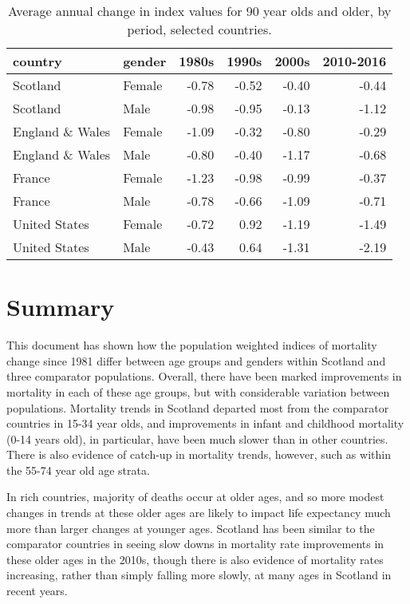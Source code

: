 \documentclass[]{article}
\begin{document}
\begin{table}

\caption{\label{tab:unnamed-chunk-12}Average annual change in index values for 90 year olds and older, by period, selected countries.}
\centering
\begin{tabular}[t]{l|l|r|r|r|r}
\hline
country & gender & 1980s & 1990s & 2000s & 2010-2016\\
\hline
Scotland & Female & -0.78 & -0.52 & -0.40 & -0.44\\
\hline
Scotland & Male & -0.98 & -0.95 & -0.13 & -1.12\\
\hline
England \& Wales & Female & -1.09 & -0.32 & -0.80 & -0.29\\
\hline
England \& Wales & Male & -0.80 & -0.40 & -1.17 & -0.68\\
\hline
France & Female & -1.23 & -0.98 & -0.99 & -0.37\\
\hline
France & Male & -0.78 & -0.66 & -1.09 & -0.71\\
\hline
United States & Female & -0.72 & 0.92 & -1.19 & -1.49\\
\hline
United States & Male & -0.43 & 0.64 & -1.31 & -2.19\\
\hline
\end{tabular}
\end{table}

\section{Summary}\label{summary}

This document has shown how the population weighted indices of mortality
change since 1981 differ between age groups and genders within Scotland
and three comparator populations. Overall, there have been marked
improvements in mortality in each of these age groups, but with
considerable variation between populations. Mortality trends in Scotland
departed most from the comparator countries in 15-34 year olds, and
improvements in infant and childhood mortality (0-14 years old), in
particular, have been much slower than in other countries. There is also
evidence of catch-up in mortality trends, however, such as within the
55-74 year old age strata.

In rich countries, majority of deaths occur at older ages, and so more
modest changes in trends at these older ages are likely to impact life
expectancy much more than larger changes at younger ages. Scotland has
been similar to the comparator countries in seeing slow downs in
mortality rate improvements in these older ages in the 2010s, though
there is also evidence of mortality rates increasing, rather than simply
falling more slowly, at many ages in Scotland in recent years.
\end{document}

